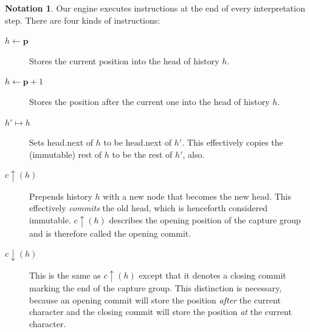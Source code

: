 \documentclass[english,twocolumn]{article}
\theoremstyle{definition}
\newtheorem*{notation}{Notation}
\newcommand{\pos}{\mathbf{\mathbf{p}}}
\begin{document}
\begin{notation}
Our engine executes instructions at the end of every interpretation
step. There are four kinds of instructions:

\begin{description}
\item [$h\leftarrow\pos$] Stores the current position into the head of history $h$.
\item [$h\leftarrow\pos+1$] Stores the position after the current one into the head of history $h$.
\item [$h'\mapsto h$] Sets head.next of $h$ to be head.next of $h'$. 
	This effectively copies the (immutable) rest of $h$ to be the rest of $h'$, also. 
\item [$c\uparrow(h)$] Prepends history $h$ with a new node that becomes the new head.
	This effectively \emph{commits} the old head, which is henceforth considered immutable. $c\uparrow(h)$
	describes the opening position of the capture group and is therefore called the opening commit. 
\item [$c\downarrow(h)$] This is the same as $c\uparrow(h)$ except that it denotes a closing commit marking the end of the capture group. 
	This distinction is necessary, because an opening commit will store the position
	\emph{after} the current character and the closing commit will store the position
	\emph{at} the current character.
\end{description}
\end{notation}
\end{document}
